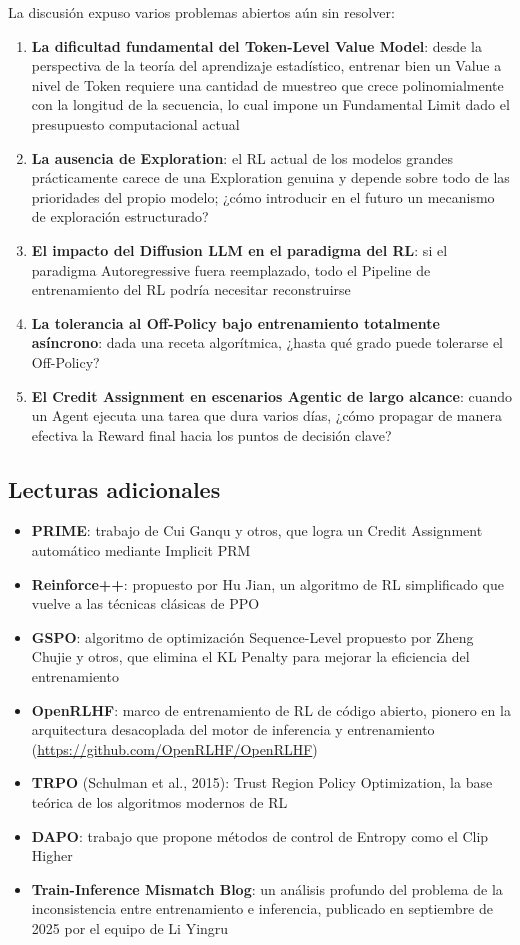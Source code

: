 La discusión expuso varios problemas abiertos aún sin resolver:

\begin{enumerate}
    \item \textbf{La dificultad fundamental del Token-Level Value Model}: desde la perspectiva de la teoría del aprendizaje estadístico, entrenar bien un Value a nivel de Token requiere una cantidad de muestreo que crece polinomialmente con la longitud de la secuencia, lo cual impone un Fundamental Limit dado el presupuesto computacional actual
    \item \textbf{La ausencia de Exploration}: el RL actual de los modelos grandes prácticamente carece de una Exploration genuina y depende sobre todo de las prioridades del propio modelo; ¿cómo introducir en el futuro un mecanismo de exploración estructurado?
    \item \textbf{El impacto del Diffusion LLM en el paradigma del RL}: si el paradigma Autoregressive fuera reemplazado, todo el Pipeline de entrenamiento del RL podría necesitar reconstruirse
    \item \textbf{La tolerancia al Off-Policy bajo entrenamiento totalmente asíncrono}: dada una receta algorítmica, ¿hasta qué grado puede tolerarse el Off-Policy?
    \item \textbf{El Credit Assignment en escenarios Agentic de largo alcance}: cuando un Agent ejecuta una tarea que dura varios días, ¿cómo propagar de manera efectiva la Reward final hacia los puntos de decisión clave?
\end{enumerate}

\subsection{Lecturas adicionales}

\begin{itemize}
    \item \textbf{PRIME}: trabajo de Cui Ganqu y otros, que logra un Credit Assignment automático mediante Implicit PRM
    \item \textbf{Reinforce++}: propuesto por Hu Jian, un algoritmo de RL simplificado que vuelve a las técnicas clásicas de PPO
    \item \textbf{GSPO}: algoritmo de optimización Sequence-Level propuesto por Zheng Chujie y otros, que elimina el KL Penalty para mejorar la eficiencia del entrenamiento
    \item \textbf{OpenRLHF}: marco de entrenamiento de RL de código abierto, pionero en la arquitectura desacoplada del motor de inferencia y entrenamiento (\url{https://github.com/OpenRLHF/OpenRLHF})
    \item \textbf{TRPO} (Schulman et al., 2015): Trust Region Policy Optimization, la base teórica de los algoritmos modernos de RL
    \item \textbf{DAPO}: trabajo que propone métodos de control de Entropy como el Clip Higher
    \item \textbf{Train-Inference Mismatch Blog}: un análisis profundo del problema de la inconsistencia entre entrenamiento e inferencia, publicado en septiembre de 2025 por el equipo de Li Yingru
\end{itemize}



